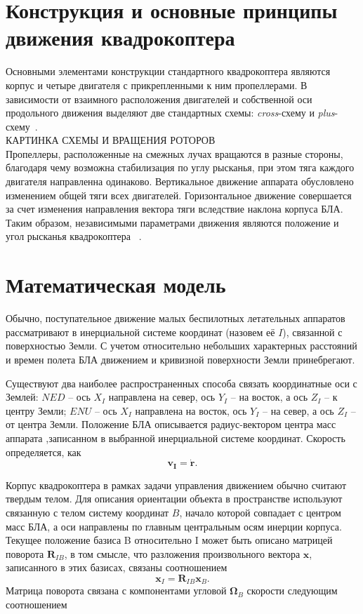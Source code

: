 \section{Конструкция и основные принципы движения квадрокоптера}

Основными элементами конструкции стандартного квадрокоптера являются корпус и четыре двигателя с прикрепленными к ним пропеллерами. В зависимости от взаимного расположения двигателей и собственной оси продольного движения выделяют две стандартных схемы: \textit{cross}-схему и \textit{plus}-схему~\cite{Bashi01}.
\\

КАРТИНКА СХЕМЫ И ВРАЩЕНИЯ РОТОРОВ
\\

Пропеллеры, расположенные на смежных лучах вращаются в разные стороны, благодаря чему возможна стабилизация по углу рысканья, при этом тяга каждого двигателя направленна одинаково. Вертикальное движение аппарата обусловлено изменением общей тяги всех двигателей. Горизонтальное движение совершается за счет изменения направления вектора тяги вследствие наклона корпуса БЛА. Таким образом, независимыми параметрами движения являются положение и угол рысканья квадрокоптера ~\cite{Salih01}. 

\section{Математическая модель}
	
Обычно, поступательное движение малых беспилотных летательных аппаратов рассматривают в инерциальной системе координат (назовем её {$I$}), связанной с поверхностью Земли. С учетом относительно небольших характерных расстояний и времен полета БЛА движением и кривизной поверхности Земли принебрегают.

Существуют два наиболее распространенных способа связать координатные оси с Землей: {$NED$} --  ось \textbf{$X_I$} направлена на север, ось \textbf{$Y_I$} -- на восток, а ось \textbf{$Z_I$} -- к центру Земли; {$ENU$} -- ось \textbf{$X_I$} направлена на восток, ось \textbf{$Y_I$} -- на север, а ось \textbf{$Z_I$} -- от центра Земли. Положение БЛА описывается радиус-вектором центра масс аппарата ,записанном в выбранной инерциальной системе координат. Скорость определяется, как
\begin{equation} \label{eq:velocity}
\bm{v_I} = \dot{\bm{r}}.
\end{equation}

Корпус квадрокоптера в рамках задачи управления движением обычно считают твердым телом. Для описания ориентации объекта в пространстве используют связанную с телом систему координат $B$, начало которой совпадает с центром масс БЛА, а оси направлены по главным центральным осям инерции корпуса. Текущее положение базиса B относительно I может быть описано матрицей поворота $\bm{R}_{IB}$, в том смысле, что разложения произвольного вектора $\bm{x}$, записанного в этих базисах, связаны соотношением
\begin{equation} \label{eq:rotmx}
\bm{x}_I = \bm{R}_{IB}\bm{x}_B.
\end{equation}
Матрица поворота связана с компонентами угловой $\bm{\Omega}_B$ скорости следующим соотношением

